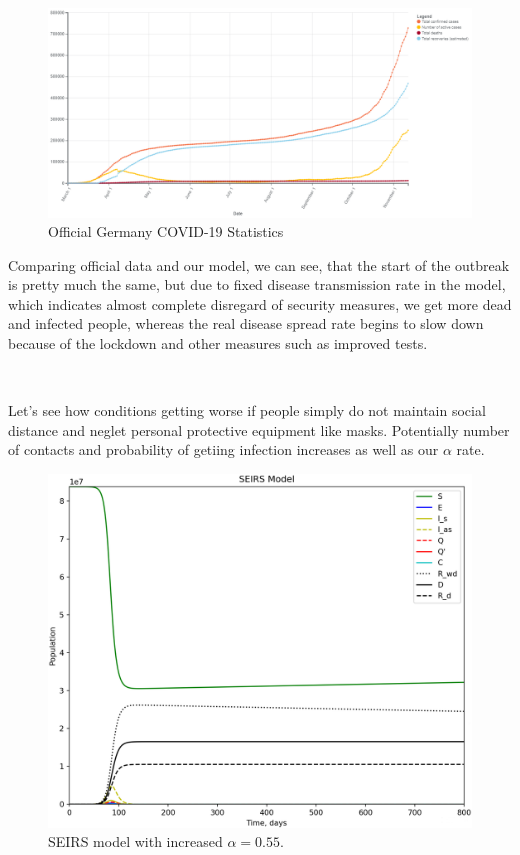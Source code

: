 \documentclass[12pt, a4paper]{article}
\begin{document}
	\begin{figure}[h!]
		\centering
		\includegraphics[width=15cm]{germany_stats.png}
		\caption{Official Germany COVID-19 Statistics}
	\end{figure}

	Comparing official data and our model, we can see, that the start of the outbreak is pretty much the same, but due to fixed disease transmission rate in the model, which indicates almost complete disregard of security measures, we get more dead and  infected people, whereas the real disease spread rate begins to slow down because of the lockdown and other measures such as improved tests. 
	
	\

	Let's see how conditions getting worse if people simply do not maintain social distance and neglet personal protective equipment like masks. Potentially number of contacts and probability of getiing infection increases as well as our $\alpha$ rate.

	\begin{figure}[h!]
		\centering
		\includegraphics[width=12cm]{seirs_bigalpha.png}
		\caption{SEIRS model with increased $\alpha = 0.55$.}
	\end{figure}
\end{document}
